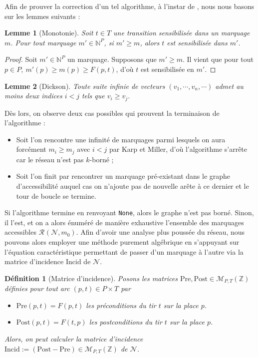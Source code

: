 \documentclass{article}
\newtheorem{definition}{Définition}
\newtheorem{lemma}{Lemme}
\theoremstyle{remark}
\theoremstyle{remark}
\newcommand{\reach}[3][]{\mathcal{R}^{#1}(\mathcal{#2}, #3)}
\newcommand{\incid}{\mathrm{Incid}}
\begin{document}
Afin de prouver la correction d'un tel algorithme, à l'instar de \cite{delfieu:hal-05069404}, nous nous basons sur les lemmes suivants :

\begin{lemma}[Monotonie]
    Soit $t \in T$ une transition sensibilisée dans un marquage $m$. Pour tout marquage $m' \in \mathbb{N}^P$, si $m' \geq m$, alors $t$ est sensibilisée dans $m'$.
\end{lemma}

\begin{proof}
    Soit $m' \in \mathbb{N}^P$ un marquage. Supposons que $m' \geq m$. Il vient que pour tout $p \in P,\ m'(p) \geq m(p) \geq F(p, t)$, d'où $t$ est sensibilisée en $m'$.
\end{proof}

\begin{lemma}[Dickson]
    Toute suite infinie de vecteurs $(v_1, \cdots, v_n, \cdots)$ admet au moins deux indices $i < j$ tels que $v_i \geq v_j$.
\end{lemma}

Dès lors, on observe deux cas possibles qui prouvent la terminaison de l'algorithme :

\begin{itemize}
    \item Soit l'on rencontre une infinité de marquages parmi lesquels on aura forcément $m_i \geq m_j$ avec $i < j$ par Karp et Miller, d'où l'algorithme s'arrête car le réseau n'est pas $k$-borné ;
    \item Soit l'on finit par rencontrer un marquage pré-existant dans le graphe d'accessibilité auquel cas on n'ajoute pas de nouvelle arête à ce dernier et le tour de boucle se termine.
\end{itemize}

Si l'algorithme termine en renvoyant \verb|None|, alors le graphe n'est pas borné. Sinon, il l'est, et on a alors énuméré de manière exhaustive l'ensemble des marquages accessibles $\reach{N}{m_0}$. Afin d'avoir une analyse plus poussée du réseau, nous pouvons alors employer une méthode purement algébrique en s'appuyant sur l'équation caractéristique permettant de passer d'un marquage à l'autre via la matrice d'incidence $\incid$ de $\mathcal{N}$.

\begin{definition}[Matrice d'incidence]
    Posons les matrices $\mathrm{Pre}, \mathrm{Post} \in \mathcal{M}_{P, T}(\mathbb{Z})$ définies pour tout arc $(p, t) \in P \times T$ par
    \begin{itemize}
        \item $\mathrm{Pre}(p, t) = F(p, t)$ les préconditions du tir $t$ sur la place $p$.
        \item $\mathrm{Post}(p, t) = F(t, p)$ les postconditions du tir $t$ sur la place $p$.
    \end{itemize}
    Alors, on peut calculer la matrice d'incidence $\incid := (\mathrm{Post} - \mathrm{Pre}) \in \mathcal{M}_{P, T}(\mathbb{Z})$ de $\mathcal{N}$.
\end{definition}
\end{document}
